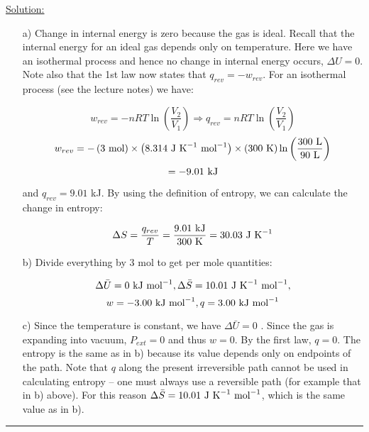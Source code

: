 \noindent
\underline{Solution:}\\

\begin{itemize}

\item[a)] Change in internal energy is zero because the gas is ideal. Recall that the internal energy for an ideal gas depends only on temperature. Here we have an isothermal process and hence no change in internal energy occurs, $\Delta U = 0$. Note also that the 1st law now states that $q_{rev} = -w_{rev}$. For an isothermal process (see the lecture notes) we have:

$$w_{rev} = -nRT\ln\left(\frac{V_2}{V_1}\right) \Rightarrow q_{rev} = nRT\ln\left(\frac{V_2}{V_1}\right)$$
$$ w_{rev} = -\left(3\textnormal{ mol}\right)\times\left(8.314\textnormal{ J K}^{-1}\textnormal{ mol}^{-1}\right)\times\left(300\textnormal{ K}\right)\ln\left(\frac{300\textnormal{ L}}{90\textnormal{ L}}\right)$$
$$ = -9.01\textnormal{ kJ}$$

and $q_{rev} = 9.01$ kJ. By using the definition of entropy, we can calculate the change in entropy:

$$\Delta S = \frac{q_{rev}}{T} = \frac{9.01\textnormal{ kJ}}{300\textnormal{ K}} = 30.03\textnormal{ J K}^{-1}$$

\item[b)] Divide everything by 3 mol to get per mole quantities:

$$\Delta\bar{U} = 0\textnormal{ kJ mol}^{-1}, \Delta\bar{S} = 10.01\textnormal{ J K}^{-1}\textnormal{ mol}^{-1},$$
$$ w = -3.00\textnormal{ kJ mol}^{-1}, q = 3.00\textnormal{ kJ mol}^{-1}$$

\item[c)] Since the temperature is constant, we have $\Delta\bar{U} = 0$ . Since the gas is expanding into vacuum, $P_{ext} = 0$ and thus $w = 0$. By the first law, $q = 0$. The entropy is the same as in b) because its value depends only on endpoints of the path. Note that $q$ along the present irreversible path cannot be used in calculating entropy -- one must always use a reversible path (for example that in b) above). For this reason $\Delta\bar{S} = 10.01\textnormal{ J K}^{-1}\textnormal{ mol}^{-1}$, which is the same value as in b).

\end{itemize}

\hrule\vspace{0.5cm}
